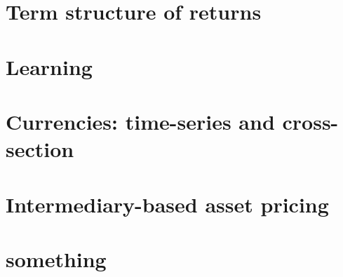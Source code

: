 \documentclass[12pt,openany]{report}
\begin{document}
\chapter{Term structure of returns}


\chapter{Learning}


\chapter{Currencies: time-series and cross-section}


\chapter{Intermediary-based asset pricing}


\chapter{something}


\newpage


\end{document}
